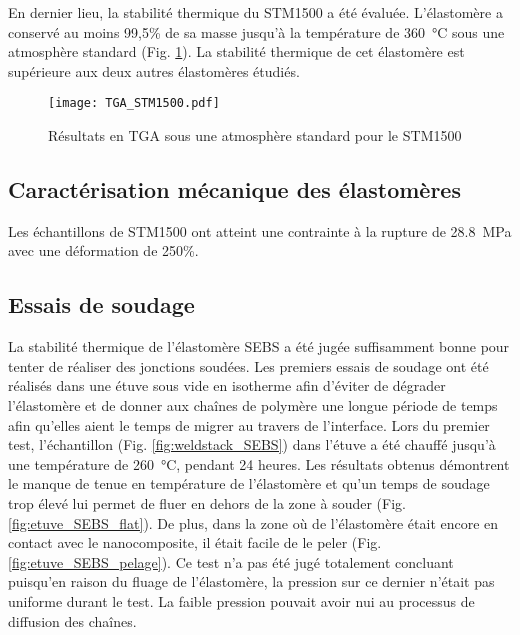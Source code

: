 \FloatBarrier

En dernier lieu, la stabilité thermique du STM1500 a été évaluée. 
L'élastomère a conservé au moins 99,5\% de sa masse jusqu'à la température de \SI{360}{\celsius} sous une atmosphère standard (Fig. \ref{fig:TGA_STM1500}). 
La stabilité thermique de cet élastomère est supérieure aux deux autres élastomères étudiés. 

\begin{figure}[h]
	\centering
	\texttt{[image: TGA\_STM1500.pdf]}
	\caption{Résultats en TGA sous une atmosphère standard pour le STM1500}
	\label{fig:TGA_STM1500}
\end{figure}

\FloatBarrier
\subsection{Caractérisation mécanique des élastomères}

Les échantillons de STM1500 ont atteint une contrainte à la rupture de \SI{28.8}{\mega\pascal} avec une déformation de 250\%. 

\FloatBarrier
\subsection{Essais de soudage}

La stabilité thermique de l'élastomère SEBS a été jugée suffisamment bonne pour tenter de réaliser des jonctions soudées. 
Les premiers essais de soudage ont été réalisés dans une étuve sous vide en isotherme afin d'éviter de dégrader l'élastomère et de donner aux chaînes de polymère une longue période de temps afin qu'elles aient le temps de migrer au travers de l'interface. 
Lors du premier test, l'échantillon (Fig. \ref{fig:weldstack_SEBS}) dans l'étuve a été chauffé jusqu'à une température de \SI{260}{\celsius}, pendant 24 heures. 
Les résultats obtenus démontrent le manque de tenue en température de l'élastomère et qu'un temps de soudage trop élevé lui permet de fluer en dehors de la zone à souder (Fig. \ref{fig:etuve_SEBS_flat}). 
De plus, dans la zone où de l'élastomère était encore en contact avec le nanocomposite, il était facile de le peler (Fig. \ref{fig:etuve_SEBS_pelage}). 
Ce test n'a pas été jugé totalement concluant puisqu'en raison du fluage de l'élastomère, la pression sur ce dernier n'était pas uniforme durant le test. 
La faible pression pouvait avoir nui au processus de diffusion des chaînes. 

